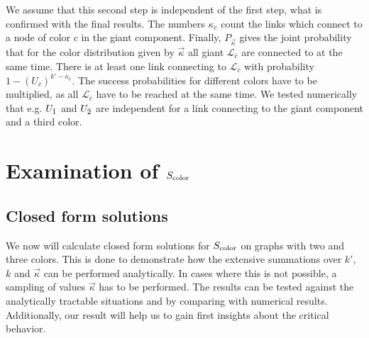 \documentclass[aps, pre, onecolumn, a4paper, floatfix]{revtex4}
\begin{document}
We assume that this second step is independent of the first step, 
what is confirmed with the final results. 
The numbers $\kappa_c$ count the links which connect to a node of color $c$ in the giant component. 
Finally, $P_{\vec \kappa}$ gives the joint probability 
that for the color distribution given by $\vec \kappa$ 
all giant $\mathcal{L}_{\bar c}$ are connected to at the same time. 
There is at least one link connecting to ${\mathcal L}_{\bar c}$ 
with probability $1-(U_{\bar c})^{k' - \kappa_c }$. 
The success probabilities for different colors have to be multiplied, 
as all ${\mathcal L}_{\bar c}$ have to be reached at the same time. 
We tested numerically that e.g. $U_{\bar{\rm 1}}$ and $U_{\bar{\rm 2}}$ are independent for a link 
connecting to the giant component and a third color. 




\section{Examination of $S_{\rm color}$}

\subsection{Closed form solutions}

We now will calculate closed form solutions for $S_{\rm color}$ 
on graphs with two and three colors. 
This is done to demonstrate how the extensive summations 
over $k'$, $k$ and $\vec \kappa$ can be performed analytically. 
In cases where this is not possible, 
a sampling of values $\vec \kappa$ has to be performed. 
The results can be tested against the analytically tractable situations 
and by comparing with numerical results. 
Additionally, our result will help us to gain first insights about the critical behavior. 
\end{document}
